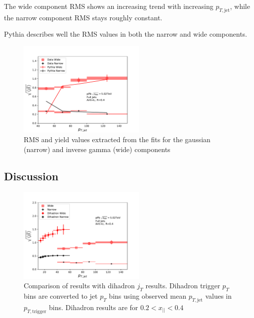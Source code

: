 The wide component RMS shows an increasing trend with increasing $p_{T,\mathrm{jet}}$, while the narrow component RMS stays roughly constant.

Pythia describes well the RMS values in both the narrow and wide components. 

\begin{figure}[htb]
\begin{center}
\includegraphics[width=0.55\textwidth]{figures/results/RMSWithSystematics_Pythia}
\caption{RMS and yield values extracted from the fits for the gaussian (narrow) and inverse gamma (wide) components}
\label{fig:rmsgamma}

\end{center}
\end{figure}









\subsection{Discussion}
\begin{figure}[htb]
\centering
\includegraphics[width=0.55\textwidth]{figures/results/RMSWithSystematics_DihadronJetPt}
\caption{Comparison of results with dihadron $j_T$ results. Dihadron trigger $p_T$ bins are converted to jet $p_T$  bins  using observed mean  $p_{T,\mathrm{jet}}$ values in $p_{T,\mathrm{trigger}}$ bins. Dihadron results are for $0.2 < x_{||} < 0.4$ }
\label{fig:DihadronComparison}
\end{figure}


